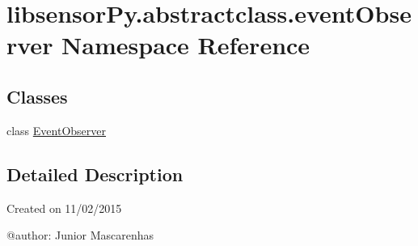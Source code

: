 \hypertarget{namespacelibsensorPy_1_1abstractclass_1_1eventObserver}{}\section{libsensor\+Py.\+abstractclass.\+event\+Observer Namespace Reference}
\label{namespacelibsensorPy_1_1abstractclass_1_1eventObserver}
\subsection*{Classes}
\begin{DoxyCompactItemize}
\item 
class \hyperlink{classlibsensorPy_1_1abstractclass_1_1eventObserver_1_1EventObserver}{Event\+Observer}
\end{DoxyCompactItemize}


\subsection{Detailed Description}
\begin{DoxyVerb}Created on 11/02/2015

@author: Junior Mascarenhas
\end{DoxyVerb}
 